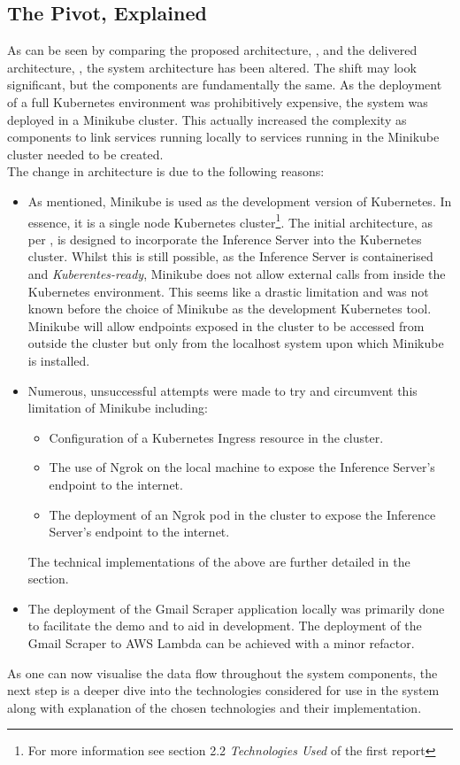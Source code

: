 \subsection{The Pivot, Explained}
\label{sec:pivot}
As can be seen by comparing the proposed architecture, , and the delivered architecture, ,
the system architecture has been altered. The shift may look significant, but the components are fundamentally the same. As the deployment
of a full Kubernetes environment was prohibitively expensive, the system was deployed in a Minikube cluster. This actually
increased the complexity as components to link services running locally to services running in the Minikube cluster needed to be created. \\
The change in architecture is due to the following reasons:
\begin{itemize}
	\item As mentioned, Minikube is used as the development version of Kubernetes. In essence, it is a single node Kubernetes
	      cluster\footnote{For more information see section 2.2 \emph{Technologies Used} of the first report}.
	      The initial architecture, as per , is designed to incorporate the Inference Server into the
	      Kubernetes cluster. Whilst this is still possible, as the Inference Server is containerised and \emph{Kuberentes-ready},
	      Minikube does not allow external calls from inside the Kubernetes environment. This seems like a drastic limitation and was
	      not known before the choice of Minikube as the development Kubernetes tool. Minikube will allow endpoints exposed in the
	      cluster to be accessed from outside the cluster but only from the localhost system upon which Minikube is installed.
	\item Numerous, unsuccessful attempts were made to try and circumvent this limitation of Minikube including:
	      \begin{itemize}
		      \item Configuration of a Kubernetes Ingress resource in the cluster.
		      \item The use of Ngrok on the local machine to expose the Inference Server's endpoint to the internet.
		      \item The deployment of an Ngrok pod in the cluster to expose the Inference Server's endpoint to the internet.
	      \end{itemize}
	      The technical implementations of the above are further detailed in the  section.
	\item The deployment of the Gmail Scraper application locally was primarily done to facilitate the demo and to aid in development. The
	      deployment of the Gmail Scraper to AWS Lambda can be achieved with a minor refactor.
\end{itemize}
As one can now visualise the data flow throughout the system components, the next step is a deeper dive into the technologies considered
for use in the system along with explanation of the chosen technologies and their implementation.

